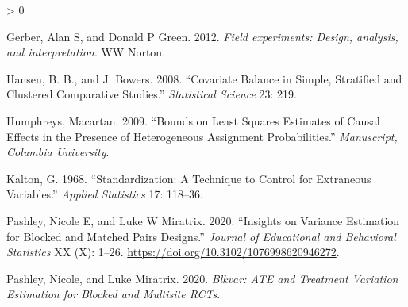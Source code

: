\documentclass[
]{article}
\newlength{\cslhangindent}
\newenvironment{CSLReferences}[2] %
 {%
  \setlength{\parindent}{0pt}
  \ifodd #1 \everypar{\setlength{\hangindent}{\cslhangindent}}\ignorespaces\fi
  \ifnum #2 > 0
  \setlength{\parskip}{#2\baselineskip}
  \fi
 }%
 {}
\begin{document}
\hypertarget{refs}{}
\begin{CSLReferences}{1}{0}
\leavevmode\hypertarget{ref-gerber2012field}{}%
Gerber, Alan S, and Donald P Green. 2012. \emph{{Field experiments: Design, analysis, and interpretation}}. WW Norton.

\leavevmode\hypertarget{ref-hansen2008cbs}{}%
Hansen, B. B., and J. Bowers. 2008. {``Covariate Balance in Simple, Stratified and Clustered Comparative Studies.''} \emph{Statistical Science} 23: 219.

\leavevmode\hypertarget{ref-humphreys2009bounds}{}%
Humphreys, Macartan. 2009. {``Bounds on Least Squares Estimates of Causal Effects in the Presence of Heterogeneous Assignment Probabilities.''} \emph{Manuscript, Columbia University}.

\leavevmode\hypertarget{ref-kalton1968}{}%
Kalton, G. 1968. {``Standardization: {A} Technique to Control for Extraneous Variables.''} \emph{Applied Statistics} 17: 118--36.

\leavevmode\hypertarget{ref-pashley2020blocked}{}%
Pashley, Nicole E, and Luke W Miratrix. 2020. {``Insights on Variance Estimation for Blocked and Matched Pairs Designs.''} \emph{Journal of Educational and Behavioral Statistics} XX (X): 1--26. \url{https://doi.org/10.3102/1076998620946272}.

\leavevmode\hypertarget{ref-pashley2020blkvar}{}%
Pashley, Nicole, and Luke Miratrix. 2020. \emph{Blkvar: ATE and Treatment Variation Estimation for Blocked and Multisite RCTs}.

\end{CSLReferences}
\end{document}
